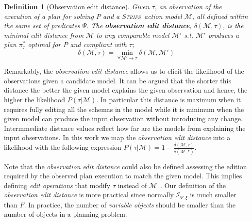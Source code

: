\documentclass[letterpaper]{article} %
\newcommand{\strips}{\textsc{Strips}}     %
\newtheorem{definition}[theorem]{Definition}
\begin{document}
\begin{definition}[Observation edit distance]
  Given $\tau$, an observation of the execution of a plan for solving $P$ and a \strips\ action model $\mathcal{M}$, all defined within the same set of predicates $\Psi$. The {\bf observation edit distance}, $\delta(\mathcal{M},\tau)$, is the minimal edit distance from $\mathcal{M}$ to any {\em comparable} model $\mathcal{M}'$ s.t. $\mathcal{M}'$ produces a plan $\pi^*_\tau$ optimal for $P$ and compliant with $\tau$; \[\delta(\mathcal{M},\tau)=\min_{\forall \mathcal{M}' \rightarrow \tau} \delta(\mathcal{M},\mathcal{M}')\]
\end{definition}

Remarkably, the {\em observation edit distance} allows us to elicit the likelihood of the observations given a candidate model. It can be argued that the shorter this  distance the better the given model explains the given observation and hence, the higher the likelihood $P(\tau|\mathcal{M})$. In particular this distance is maximum when it requires fully editing all the schemas in the model while it is minimum when the given model can produce the input observation without introducing any change. Intermmediate distance values reflect how far are the models from explaining the input observations. In this work we map the {\em observation edit distance} into a likelihood with the following expression $P(\tau|\mathcal{M}) = 1-\frac{\delta(\mathcal{M},\tau)}{\delta(\mathcal{M},*)}$.

Note that the {\em observation edit distance} could also be defined assessing the edition required by the observed plan execution to match the given model. This implies defining {\em edit operations} that modify $\tau$ instead of $\mathcal{M}$~\cite{sohrabi:precognition:IJCAI2016}. Our definition of the {\em observation edit distance} is more practical since normally ${\mathcal I}_{\Psi,\xi}$ is much smaller than $F$. In practice, the number of {\em variable objects} should be smaller than the number of objects in a planning problem.
\end{document}
